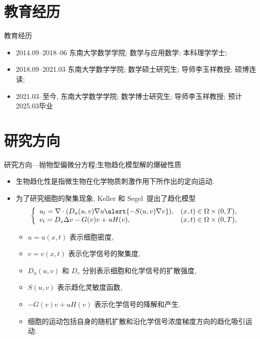 \section{教育经历}

\begin{frame}{教育经历}
	\begin{itemize}
		\item 2014.09--2018--06 东南大学数学学院; 数学与应用数学; 本科理学学士;
		\item 2018.09--2021.03 东南大学数学学院; 数学硕士研究生; 导师李玉祥教授; 硕博连读;
		\item 2021.03--至今, 东南大学数学学院; 数学博士研究生; 导师李玉祥教授; 预计2025.03毕业
	\end{itemize}
\end{frame}

\section{研究方向}

\begin{frame}{研究方向---抛物型偏微分方程;生物趋化模型解的爆破性质}
  
\begin{itemize}
    \item 生物趋化性是指微生物在化学物质刺激作用下所作出的定向运动.
    \item 为了研究细胞的\alert{聚集}现象, Keller 和 Segel~提出了趋化模型
\begin{equation*}\label{sys: general ks ch1}
	\left\{
	\begin{array}{ll}
		u_t = \nabla\cdot(D_u(u,v)\nabla u \alert{- S(u,v)\nabla v}), & (x, t)\in \Omega\times(0, T), \\
		v_t = D_v\Delta v  - G(v)v + uH(v),                   & (x, t)\in \Omega\times(0, T), \\
	\end{array}
	\right.
\end{equation*}
\begin{itemize}
\item $u = u(x, t)$ 表示细胞密度,
\item $v = v(x, t)$ 表示化学信号的聚集度,
\item $D_u(u,v)$ 和 $D_v$ 分别表示细胞和化学信号的扩散强度,
\item $S(u,v)$ 表示趋化灵敏度函数,
\item $-G(v)v + uH(v)$ 表示化学信号的降解和产生.
\item 细胞的运动包括自身的随机扩散和\alert{沿化学信号浓度梯度方向的趋化吸引运动}.
\end{itemize}
\end{itemize}
\end{frame}